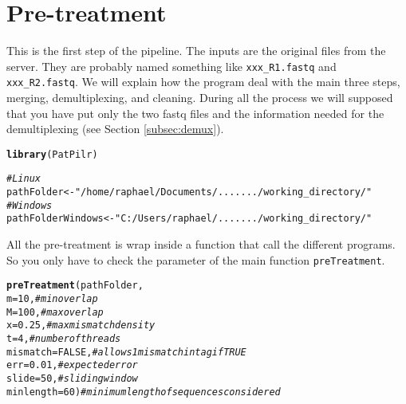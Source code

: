 \documentclass{article}\usepackage[]{graphicx}\usepackage[]{color}
\makeatletter
\newcommand{\hlnum}[1]{\textcolor[rgb]{0.686,0.059,0.569}{#1}}%
\newcommand{\hlstr}[1]{\textcolor[rgb]{0.192,0.494,0.8}{#1}}%
\newcommand{\hlcom}[1]{\textcolor[rgb]{0.678,0.584,0.686}{\textit{#1}}}%
\newcommand{\hlstd}[1]{\textcolor[rgb]{0.345,0.345,0.345}{#1}}%
\newcommand{\hlkwb}[1]{\textcolor[rgb]{0.69,0.353,0.396}{#1}}%
\newcommand{\hlkwc}[1]{\textcolor[rgb]{0.333,0.667,0.333}{#1}}%
\newcommand{\hlkwd}[1]{\textcolor[rgb]{0.737,0.353,0.396}{\textbf{#1}}}%
\newenvironment{kframe}{%
 \def\at@end@of@kframe{}%
 \ifinner\ifhmode%
  \def\at@end@of@kframe{\end{minipage}}%
  \begin{minipage}{\columnwidth}%
 \fi\fi%
 \def\FrameCommand##1{\hskip\@totalleftmargin \hskip-\fboxsep
 \colorbox{shadecolor}{##1}\hskip-\fboxsep
     \hskip-\linewidth \hskip-\@totalleftmargin \hskip\columnwidth}%
 \MakeFramed {\advance\hsize-\width
   \@totalleftmargin\z@ \linewidth\hsize
   \@setminipage}}%
 {\par\unskip\endMakeFramed%
 \at@end@of@kframe}
\newenvironment{knitrout}{}{} %
\makeatother
\begin{document}
\section{Pre-treatment}
\label{sec:pretreatment}
This is the first step of the pipeline. The inputs are the original files from the server. They are probably named something like \texttt{xxx\_R1.fastq} and \texttt{xxx\_R2.fastq}. We will explain how the program deal with the main three steps, merging, demultiplexing, and cleaning. During all the process we will supposed that you have put only the two fastq files and the information needed for the demultiplexing (see Section \ref{subsec:demux}).

\begin{knitrout}
\color{fgcolor}\begin{kframe}
\begin{alltt}
\hlkwd{library}\hlstd{(PatPilr)}

\hlcom{#Linux}
\hlstd{pathFolder} \hlkwb{<-} \hlstr{"/home/raphael/Documents/......./working_directory/"}
\hlcom{#Windows}
\hlstd{pathFolderWindows} \hlkwb{<-} \hlstr{"C:/Users/raphael/......./working_directory/"}
\end{alltt}
\end{kframe}
\end{knitrout}

All the pre-treatment is wrap inside a function that call the different programs. So you only have to check the parameter of the main function \texttt{preTreatment}.

\begin{knitrout}
\color{fgcolor}\begin{kframe}
\begin{alltt}
\hlkwd{preTreatment}\hlstd{(pathFolder,}
  \hlkwc{m} \hlstd{=} \hlnum{10}\hlstd{,} \hlcom{# min overlap}
  \hlkwc{M} \hlstd{=} \hlnum{100}\hlstd{,} \hlcom{# max overlap}
  \hlkwc{x} \hlstd{=} \hlnum{0.25}\hlstd{,} \hlcom{# max mismatch density}
  \hlkwc{t} \hlstd{=} \hlnum{4}\hlstd{,} \hlcom{# number of threads}
  \hlkwc{mismatch} \hlstd{=} \hlnum{FALSE}\hlstd{,} \hlcom{# allows 1 mismatch in tag if TRUE}
  \hlkwc{err} \hlstd{=} \hlnum{0.01}\hlstd{,} \hlcom{# expected error}
  \hlkwc{slide} \hlstd{=} \hlnum{50}\hlstd{,} \hlcom{# sliding window}
  \hlkwc{minlength} \hlstd{=} \hlnum{60}\hlstd{)} \hlcom{# minimum length of sequences considered}
\end{alltt}
\end{kframe}
\end{knitrout}
\end{document}
